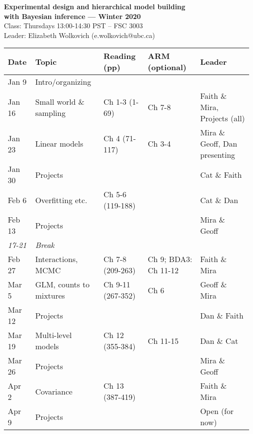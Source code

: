 \documentclass[11pt]{article}
\renewcommand{\baselinestretch}{1.20}
\begin{document}
 
\begin{center} {\large \textbf{Experimental design and hierarchical model building \\ with Bayesian inference --- Winter 2020}}\\ [10pt] %
Class: Thursdays 13:00-14:30 PST -- FSC 3003  \\ 
Leader: Elizabeth Wolkovich (e.wolkovich@ubc.ca) \\
\end{center} 
\renewcommand{\baselinestretch}{1.10}

\begin{center}
\begin{tabular}{p{1.2cm} p{3.5cm}  p{3.5cm}  p{2.5cm}  p{3cm} }
   \textbf{Date}
   & \textbf{Topic}
      & \textbf{Reading (pp)}
        & \textbf{ARM (optional)}
         & \textbf{Leader}  \\ 
\hline \hline
Jan 9  & Intro/organizing &           &    & \\ %
Jan 16 & Small world \& sampling       &     Ch 1-3  (1-69)  & Ch 7-8 & Faith \& Mira, Projects (all) \\ %
Jan 23 &  Linear models        &       Ch 4 (71-117) \footnotemark[1] & Ch 3-4  & Mira \&  Geoff, Dan presenting\\ 
Jan 30 & Projects & & & Cat \& Faith\\
Feb 6  & Overfitting etc.      &   Ch 5-6 (119-188)\footnotemark[2] & & Cat \& Dan  \\ %
Feb 13 & Projects & & & Mira \& Geoff \\
\emph{17-21}  &    \emph{Break}     &               &        & \\
Feb 27   & Interactions, MCMC &  Ch 7-8 (209-263) & Ch 9; BDA3: Ch 11-12&  Faith \& Mira\\ %
Mar 5   & GLM, counts to mixtures               &    Ch 9-11 (267-352) & Ch 6 & Geoff \& Mira \\ %
Mar 12 & Projects & & &  Dan \& Faith\\
Mar 19  & Multi-level models          &  Ch 12 (355-384)    &  Ch 11-15   & Dan \& Cat \\
Mar 26 & Projects & & & Mira \& Geoff \\
Apr 2  & Covariance &        Ch 13 (387-419)   & & Faith \& Mira \\ %
Apr 9 & Projects & & & Open (for now) \\
\hline
\end{tabular}
\end{center}
\end{document}
